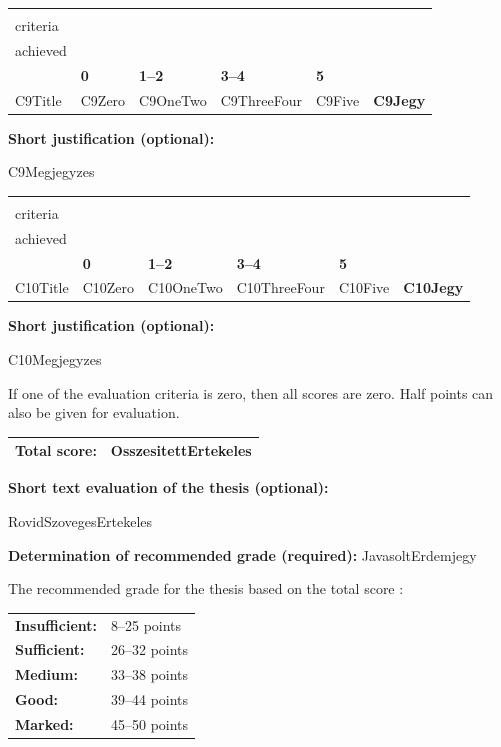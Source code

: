 \documentclass[a4paper,12pt]{article}
\newcommand{\EvaluationTable}[7]{

\renewcommand{\arraystretch}{1.35}

{\fontsize{8pt}{9.5pt}\selectfont

\begin{tabularx}{\textwidth}{|
>{\raggedright\arraybackslash}p{3.5cm}|
>{\raggedright\arraybackslash}X|
>{\raggedright\arraybackslash}X|
>{\raggedright\arraybackslash}X|
>{\raggedright\arraybackslash}X|
>{\centering\arraybackslash}m{1.8cm}|}

\hline

\multirow{2}{=}{\centering\textbf{Evaluation\\criteria}}
&
\multicolumn{4}{c|}{\textbf{Awardable score}}
&
\multirow{2}{=}{\centering\textbf{Score\\achieved}}
\\

\cline{2-5}

&
\textbf{0}
&
\textbf{1--2}
&
\textbf{3--4}
&
\textbf{5}
&
\\

\hline

#1
&
#2
&
#3
&
#4
&
#5
&
\textbf{#6}

\\
\hline

\end{tabularx}

\vspace{3mm}

\textbf{Short justification (optional):}

\vspace{2mm}

#7

\vspace{8mm}

}
}
\begin{document}
\EvaluationTable
{ {{C9Title}} }
{ {{C9Zero}} }
{ {{C9OneTwo}} }
{ {{C9ThreeFour}} }
{ {{C9Five}} }
{ {{C9Jegy}} }
{ {{C9Megjegyzes}} }

\EvaluationTable
{ {{C10Title}} }
{ {{C10Zero}} }
{ {{C10OneTwo}} }
{ {{C10ThreeFour}} }
{ {{C10Five}} }
{ {{C10Jegy}} }
{ {{C10Megjegyzes}} }

\bigskip

If one of the evaluation criteria is zero, then all scores are zero. Half points can also be given for evaluation.

\bigskip

\begin{center}

\begin{tabular}{|l|c|}
\hline

\textbf{Total score:} &
\textbf{{{OsszesitettErtekeles}}}

\\
\hline

\end{tabular}

\end{center}

\bigskip

\textbf{Short text evaluation of the thesis (optional):}

\vspace{0.3cm}

{{RovidSzovegesErtekeles}}

\vspace{1cm}

\textbf{Determination of recommended grade (required):} {{JavasoltErdemjegy}}

\vspace{0.3cm}

The recommended grade for the thesis based on the total score :

\bigskip

\begin{tabular}{ll}

\textbf{Insufficient:} & 8--25 points \\

\textbf{Sufficient:} & 26--32 points \\

\textbf{Medium:} & 33--38 points \\

\textbf{Good:} & 39--44 points \\

\textbf{Marked:} & 45--50 points \\

\end{tabular}
\end{document}
